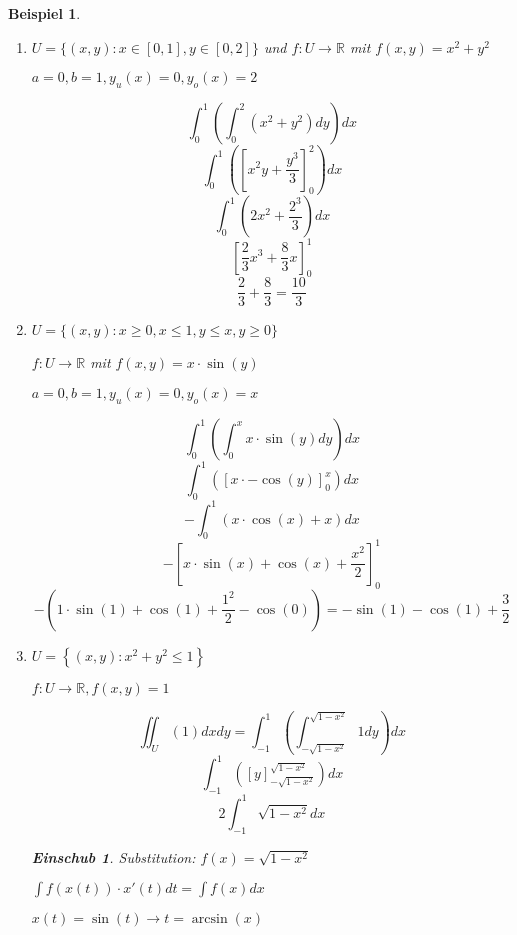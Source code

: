 \documentclass[12pt,a4paper]{scrreprt}
\newtheorem{beispiel}[defi]{Beispiel}
\newtheorem*{einschub}{Einschub}
\begin{document}
	\begin{beispiel}
		\begin{enumerate}

			\item $U=\{(x,y):x \in [0,1], y \in [0,2]\}$ und $f:U\to\mathbb{R}$ mit $f(x,y)=x^2+y^2$

				$a=0,b=1,y_u(x)=0,y_o(x)=2$

				\[\int^1_0 \left(\int^{2}_{0} (x^2+y^2)dy\right)dx\]
				\[\int^1_0 \left({\left[x^2y+\frac{y^3}{3}\right]}^{2}_{0}\right)dx\]
				\[\int^1_0 \left(2x^2+\frac{2^3}{3}\right)dx\]
				\[{\left[\frac{2}{3}x^3+\frac{8}{3}x\right]}^1_0\]
				\[\frac{2}{3}+\frac{8}{3}=\frac{10}{3}\]

		\item $U=\{(x,y):x \geq 0, x \leq 1, y \leq x, y \geq 0\}$

			$f:U\to\mathbb{R}$ mit $f(x,y)=x\cdot\sin(y)$

			$a=0,b=1,y_u(x)=0,y_o(x)=x$

			\[\int^1_0 \left(\int^{x}_{0} x\cdot\sin(y)dy\right)dx\]
			\[\int^1_0 \left({\left[x\cdot-\cos(y)\right]}^{x}_{0}\right)dx\]
			\[-\int^1_0 \left(x\cdot\cos(x)+x\right)dx\]
			\[-{\left[x\cdot\sin(x)+\cos(x)+\frac{x^2}{2}\right]}^1_0\]
			\[-\left(1\cdot\sin(1)+\cos(1)+\frac{1^2}{2}-\cos(0)\right)=-\sin(1)-\cos(1)+\frac{3}{2}\]

		\item $U=\left\{(x,y):x^2+y^2\le1\right\}$
		
		$f:U\to\mathbb{R},f(x,y)=1$


		\[\iint_U\left(1\right)dxdy=\int_{-1}^1 \left(\int_{-\sqrt{1-x^2}}^{\sqrt{1-x^2}}1dy\right)dx\]
		\[\int_{-1}^1 \left({\left[y\right]}_{-\sqrt{1-x^2}}^{\sqrt{1-x^2}}\right)dx\]
		\[2\int_{-1}^1 \sqrt{1-x^2}dx\]

		\begin{einschub}
			Substitution: $f(x)=\sqrt{1-x^2}$

			\(\int f(x(t))\cdot x'(t)dt=\int f(x)dx\)
			
			$x(t)=\sin(t) \to t=\arcsin(x)$


\end{einschub}
\end{enumerate}
\end{beispiel}
\end{document}
